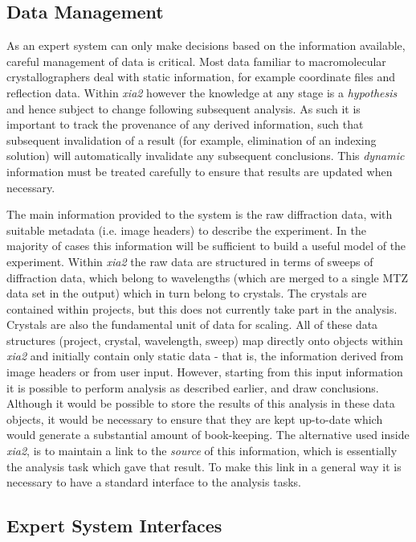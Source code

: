 \documentclass[preprint,pdf]{iucr}
\begin{document}
\subsection{Data Management}

As an expert system can only make decisions based on the information
available, careful management of data is critical. Most data familiar
to macromolecular crystallographers deal with static
information, for example coordinate files and reflection data. 
Within \emph{xia2} however
the knowledge at any stage is a \emph{hypothesis} and hence
subject to change following subsequent analysis. As such it is
important to track the provenance of any derived information, such
that subsequent invalidation of a result (for example, elimination of
an indexing solution) will automatically invalidate any subsequent
conclusions. This \emph{dynamic} information must be treated carefully
to ensure that results are updated when necessary. 

The main information provided to the system is the raw diffraction
data, with suitable metadata (i.e. image headers) to describe the
experiment. In the majority of
cases this information will be sufficient to build
a useful model of the experiment. Within \emph{xia2} the raw data are
structured in terms of sweeps of diffraction data, which belong to
wavelengths (which are merged to a single MTZ data set in the output)
which in turn belong to crystals. The crystals are contained within
projects, but this does not currently take part in the analysis. Crystals
are also the fundamental unit of data for scaling. All of these
data structures (project, crystal, wavelength, sweep) map directly onto
objects within \emph{xia2} and initially contain only static data -
that is, the information derived from image headers or from user
input. However, starting from this input information it is possible to
perform analysis as described earlier, and draw 
conclusions. Although it would be possible to store the results of
this analysis in these data objects, it would be necessary to ensure
that they are kept up-to-date which would generate a substantial
amount of book-keeping. The alternative used inside
\emph{xia2}, is to maintain a link to the
\emph{source} of this information, which is essentially the analysis
task which gave that result. To make this link in a general
way it is necessary to have a standard interface to the analysis
tasks.

\subsection{Expert System Interfaces}
\end{document}
